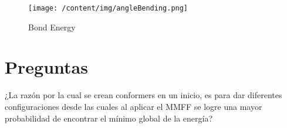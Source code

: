\documentclass{article}%
\begin{document}
\begin{figure}[H]%
\centering%
\texttt{[image: /content/img/angleBending.png]}%
\caption{Bond Energy}%
\end{figure}

%
\section{Preguntas}%
\label{sec:Preguntas}%
¿La razón por la cual se crean conformers en un inicio, es para dar diferentes configuraciones desde las cuales al aplicar el MMFF se logre una mayor probabilidad de encontrar el mínimo global de la energía?

%
\end{document}
